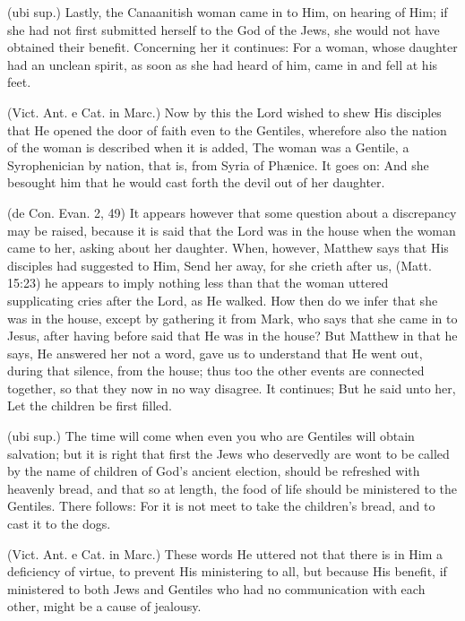  (ubi sup.) Lastly, the Canaanitish woman came in to Him, on hearing of Him; if she had not first submitted herself to the God of the Jews, she would not have obtained their benefit. Concerning her it continues: For a woman, whose daughter had an unclean spirit, as soon as she had heard of him, came in and fell at his feet.

 (Vict. Ant. e Cat. in Marc.) Now by this the Lord wished to shew His disciples that He opened the door of faith even to the Gentiles, wherefore also the nation of the woman is described when it is added, The woman was a Gentile, a Syrophenician by nation, that is, from Syria of Phænice. It goes on: And she besought him that he would cast forth the devil out of her daughter.

 (de Con. Evan. 2, 49) It appears however that some question about a discrepancy may be raised, because it is said that the Lord was in the house when the woman came to her, asking about her daughter. When, however, Matthew says that His disciples had suggested to Him, Send her away, for she crieth after us, (Matt. 15:23) he appears to imply nothing less than that the woman uttered supplicating cries after the Lord, as He walked. How then do we infer that she was in the house, except by gathering it from Mark, who says that she came in to Jesus, after having before said that He was in the house? But Matthew in that he says, He answered her not a word, gave us to understand that He went out, during that silence, from the house; thus too the other events are connected together, so that they now in no way disagree. It continues; But he said unto her, Let the children be first filled.

 (ubi sup.) The time will come when even you who are Gentiles will obtain salvation; but it is right that first the Jews who deservedly are wont to be called by the name of children of God’s ancient election, should be refreshed with heavenly bread, and that so at length, the food of life should be ministered to the Gentiles. There follows: For it is not meet to take the children’s bread, and to cast it to the dogs.

 (Vict. Ant. e Cat. in Marc.) These words He uttered not that there is in Him a deficiency of virtue, to prevent His ministering to all, but because His benefit, if ministered to both Jews and Gentiles who had no communication with each other, might be a cause of jealousy.


